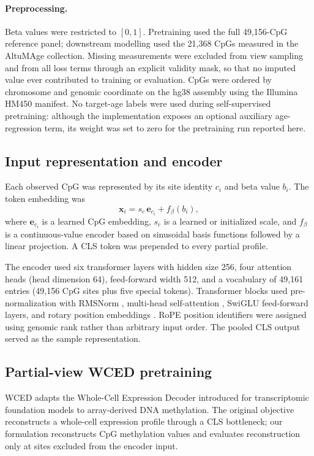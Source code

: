 \paragraph{Preprocessing.}
Beta values were restricted to $[0,1]$. Pretraining used the full 49,156-CpG reference panel;
downstream modelling used the 21,368 CpGs measured in the AltuMAge collection. Missing
measurements were excluded from view sampling and from all loss terms through an explicit
validity mask, so that no imputed value ever contributed to training or evaluation. CpGs were
ordered by chromosome and genomic coordinate on the hg38 assembly using the Illumina HM450
manifest. No target-age labels were used during self-supervised pretraining: although the
implementation exposes an optional auxiliary age-regression term, its weight was set to zero
for the pretraining run reported here.

\subsection{Input representation and encoder}

Each observed CpG was represented by its site identity $c_i$ and beta value $b_i$. The token
embedding was
\begin{equation}
  \bm{x}_i = s_c\,\bm{e}_{c_i} + f_{\beta}(b_i),
\end{equation}
where $\bm{e}_{c_i}$ is a learned CpG embedding, $s_c$ is a learned or initialized scale, and
$f_{\beta}$ is a continuous-value encoder based on sinusoidal basis functions followed by a
linear projection. A CLS token was prepended to every partial profile.

The encoder used six transformer layers with hidden size 256, four attention heads (head
dimension 64), feed-forward width 512, and a vocabulary of 49,161 entries (49,156 CpG sites
plus five special tokens). Transformer blocks used
pre-normalization with RMSNorm \citep{Zhang2019}, multi-head self-attention
\citep{Vaswani2017}, SwiGLU feed-forward layers, and rotary position embeddings
\citep{Su2024,Touvron2023}. RoPE position identifiers were assigned using genomic rank rather
than arbitrary input order. The pooled CLS output served as the sample representation.

\subsection{Partial-view WCED pretraining}

WCED adapts the Whole-Cell Expression Decoder introduced for transcriptomic foundation models
\citep{Dandala2025} to array-derived DNA methylation. The original objective reconstructs a
whole-cell expression profile through a CLS bottleneck; our formulation reconstructs CpG
methylation values and evaluates reconstruction only at sites excluded from the encoder input.

